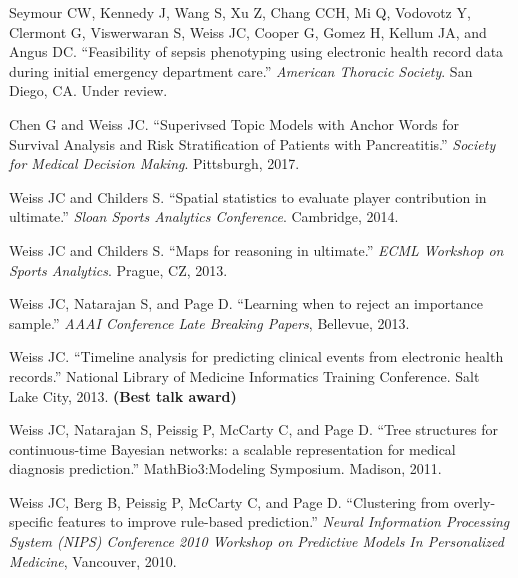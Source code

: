 \begin{bibsection}

\item  Seymour CW, Kennedy J, Wang S, Xu Z, Chang CCH, Mi Q, Vodovotz Y, Clermont G, Viswerwaran S, Weiss JC, Cooper G, Gomez H, Kellum JA, and Angus DC. ``Feasibility of sepsis phenotyping using electronic health record data during initial emergency department care.'' \textit{American Thoracic Society}. San Diego, CA. Under review.
  
\item  Chen G and Weiss JC. ``Superivsed Topic Models with Anchor Words for Survival Analysis and Risk Stratification of Patients with Pancreatitis.'' \textit{Society for Medical Decision Making}. Pittsburgh, 2017.
  
\item  Weiss JC and Childers S. ``Spatial statistics to evaluate player contribution in ultimate.'' \textit{Sloan Sports Analytics Conference}. Cambridge, 2014.

\item  Weiss JC and Childers S. ``Maps for reasoning in ultimate.'' \textit{ECML Workshop on Sports Analytics}. Prague, CZ, 2013.

\item  Weiss JC, Natarajan S, and Page D. ``Learning when to reject an importance sample.'' \textit{AAAI Conference Late Breaking Papers}, Bellevue, 2013.

\item  Weiss JC. ``Timeline analysis for predicting clinical events from electronic health records.'' National Library of Medicine Informatics Training Conference. Salt Lake City, 2013. \textbf{(Best talk award)}

\item  Weiss JC, Natarajan S, Peissig P, McCarty C, and Page D. ``Tree structures for continuous-time Bayesian networks: a scalable representation for medical diagnosis prediction.'' MathBio3:Modeling Symposium. Madison, 2011.

\item  Weiss JC, Berg B, Peissig P, McCarty C, and Page D. ``Clustering from overly-specific features to improve rule-based prediction.'' \textit{Neural Information Processing System (NIPS) Conference 2010 Workshop on Predictive Models In Personalized Medicine}, Vancouver, 2010.
 
\end{bibsection}


